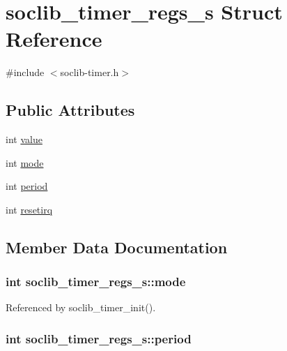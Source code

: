 \hypertarget{structsoclib__timer__regs__s}{\section{soclib\-\_\-timer\-\_\-regs\-\_\-s Struct Reference}
\label{structsoclib__timer__regs__s}
}


{\ttfamily \#include $<$soclib-\/timer.\-h$>$}

\subsection*{Public Attributes}
\begin{DoxyCompactItemize}
\item 
int \hyperlink{structsoclib__timer__regs__s_aae29d921b654ae30462d290a8353fb78}{value}
\item 
int \hyperlink{structsoclib__timer__regs__s_a8f8b1e300fcf7423f473ace9fb4fff38}{mode}
\item 
int \hyperlink{structsoclib__timer__regs__s_ad9bb0a6b31bd61f2fc040498f6358af6}{period}
\item 
int \hyperlink{structsoclib__timer__regs__s_a63084f461aed6b427e0fcf6028e70ce0}{resetirq}
\end{DoxyCompactItemize}


\subsection{Member Data Documentation}
\hypertarget{structsoclib__timer__regs__s_a8f8b1e300fcf7423f473ace9fb4fff38}{
\subsubsection[{mode}]{\setlength{\rightskip}{0pt plus 5cm}int soclib\-\_\-timer\-\_\-regs\-\_\-s\-::mode}}\label{structsoclib__timer__regs__s_a8f8b1e300fcf7423f473ace9fb4fff38}


Referenced by soclib\-\_\-timer\-\_\-init().

\hypertarget{structsoclib__timer__regs__s_ad9bb0a6b31bd61f2fc040498f6358af6}{
\subsubsection[{period}]{\setlength{\rightskip}{0pt plus 5cm}int soclib\-\_\-timer\-\_\-regs\-\_\-s\-::period}}\label{structsoclib__timer__regs__s_ad9bb0a6b31bd61f2fc040498f6358af6}


